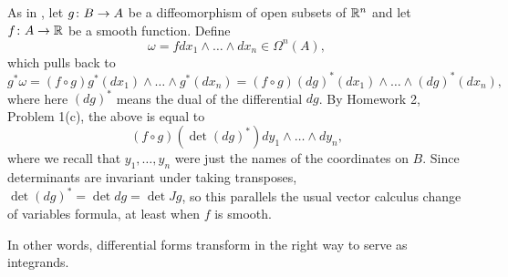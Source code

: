 As in , let $g \colon\thinspace\! B \to A$ be a diffeomorphism of open subsets of $\mathbb{R}^n$ and let $f \colon\thinspace\! A \to \mathbb{R}$ be a smooth function. Define
\[
	\omega = f dx_1 \wedge \dots \wedge dx_n \in \Omega^n(A),
\]
which pulls back to
\[
	g^\ast \omega = (f \circ g) g^\ast (dx_1) \wedge \dots \wedge g^\ast(dx_n) = (f \circ g) (dg)^\ast (dx_1) \wedge \dots \wedge (dg)^\ast (dx_n),
\]
where here $(dg)^\ast$ means the dual of the differential $dg$. By Homework 2, Problem 1(c), the above is equal to 
\[
	(f \circ g) (\det (dg)^\ast) dy_1 \wedge \dots \wedge dy_n,
\]
where we recall that $y_1, \dots , y_n$ were just the names of the coordinates on $B$. Since determinants are invariant under taking transposes, $\det(dg)^\ast = \det dg = \det Jg$, so this parallels the usual vector calculus change of variables formula, at least when $f$ is smooth.

In other words, differential forms transform in the right way to serve as integrands.

